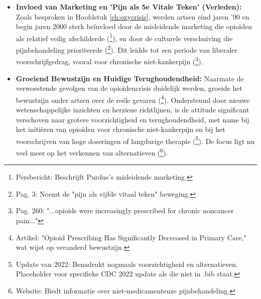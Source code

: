 \documentclass[11pt, a4paper]{report} %
\begin{document}
\begin{itemize}
    \item \textbf{Invloed van Marketing en 'Pijn als 5e Vitale Teken' (Verleden):} Zoals besproken in Hoofdstuk \ref{ch:oxycrisis}, werden artsen eind jaren '90 en begin jaren 2000 sterk beïnvloed door de misleidende marketing die opioïden als relatief veilig afschilderde (\cite{JusticeDeptPurdueResolution}\footnote{Persbericht: Beschrijft Purdue's misleidende marketing.}), en door de culturele verschuiving die pijnbehandeling prioriteerde (\cite{Maclean2020EconomicStudiesOpioid}\footnote{Pag. 3: Noemt de "pijn als vijfde vitaal teken" beweging.}). Dit leidde tot een periode van liberaler voorschrijfgedrag, vooral voor chronische niet-kankerpijn (\cite{Cicero2017Review}\footnote{Pag. 260: "...opioids were increasingly prescribed for chronic noncancer pain..."}).
    \item \textbf{Groeiend Bewustzijn en Huidige Terughoudendheid:} Naarmate de verwoestende gevolgen van de opioïdencrisis duidelijk werden, groeide het bewustzijn onder artsen over de reële gevaren (\cite{AAFP2024OpioidDecrease}\footnote{Artikel: "Opioid Prescribing Has Significantly Decreased in Primary Care," wat wijst op veranderd bewustzijn.}). Ondersteund door nieuwe wetenschappelijke inzichten en herziene richtlijnen, is de attitude significant verschoven naar grotere voorzichtigheid en terughoudendheid, met name bij het initiëren van opioïden voor chronische niet-kankerpijn en bij het voorschrijven van hoge doseringen of langdurige therapie (\cite{Dowell2022CDCGuidelineUpdate}\footnote{Update van 2022: Benadrukt nogmaals voorzichtigheid en alternatieven. Placeholder voor specifieke CDC 2022 update als die niet in .bib staat.}). De focus ligt nu veel meer op het verkennen van alternatieven (\cite{MedlinePlusNonDrugPain}\footnote{Website: Biedt informatie over niet-medicamenteuze pijnbehandeling.}).

\end{itemize}
\end{document}
